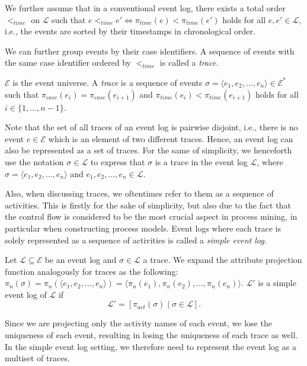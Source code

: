 We further assume that in a conventional event log, there exists a total order $<_{time}$ on $\mathcal{L}$ such that $e <_{time} e' \iff \pi_{time}(e) < \pi_{time}(e')$ holds for all $e, e' \in \mathcal{L}$, i.e., the events are sorted by their timestamps in chronological order.

We can further group events by their case identifiers. A sequence of events with the same case identifier ordered by $<_{time}$ is called a \emph{trace}.

\begin{definition}[Trace]
    $\mathcal{E}$ is the event universe. A \emph{trace} is a sequence of events $\sigma = \langle e_1, e_2, \dots, e_n \rangle \in \mathcal{E}^*$ such that $\pi_{case}(e_i) = \pi_{case}(e_{i+1})$ and $\pi_{time}(e_i) < \pi_{time}(e_{i+1})$ holds for all $i \in \{1, \dots, n-1\}$.
\end{definition}

Note that the set of all traces of an event log is pairwise disjoint, i.e., there is no event $e \in \mathcal{E}$ which is an element of two different traces. Hence, an event log can also be represented as a set of traces. For the same of simplicity, we henceforth use the notation $\sigma \in \mathcal{L}$ to express that $\sigma$ is a trace in the event log $\mathcal{L}$, where $\sigma = \langle e_1, e_2, \dots, e_n \rangle$ and $e_1, e_2, \dots, e_n \in \mathcal{L}$.

Also, when discussing traces, we oftentimes refer to them as a sequence of activities. This is firstly for the sake of simplicity, but also due to the fact that the control flow is considered to be the most crucial aspect in process mining, in particular when constructing process models. Event logs where each trace is solely represented as a sequence of activities is called a \emph{simple event log}.

\begin{definition}
    Let $\mathcal{L} \subseteq \mathcal{E}$ be an event log and $\sigma \in \mathcal{L}$ a trace. We expand the attribute projection function analogously for traces as the following: $\pi_n(\sigma) = \pi_n(\langle e_1, e_2, \dots, e_n \rangle) = \langle \pi_n(e_1), \pi_n(e_2), \dots, \pi_n(e_n) \rangle$. $\mathcal{L'}$ is a simple event log of $\mathcal{L}$ if
    \[
        \mathcal{L'} = \left[ \pi_{act}(\sigma) \mid \sigma \in \mathcal{L} \right].
    \]
\end{definition}

Since we are projecting only the activity names of each event, we lose the uniqueness of each event, resulting in losing the uniqueness of each trace as well. In the simple event log setting, we therefore need to represent the event log as a multiset of traces.

